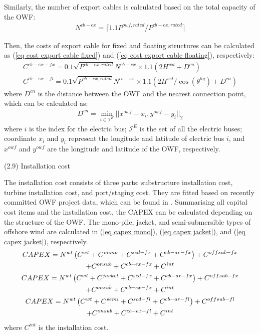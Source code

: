 \documentclass[sn-mathphys,Numbered]{sn-jnl}%
\theoremstyle{thmstyleone}%
\theoremstyle{thmstyletwo}%
\theoremstyle{thmstylethree}%
\begin{document}
Similarly, the number of export cables is calculated based on the total capacity of the OWF:
\begin{gather}
    N^{cb-ex} = \lceil 1.1 P^{owf,rated} / P^{cb-ex,rated} \rceil
\end{gather}

Then, the costs of export cable for fixed and floating structures can be calculated as (\ref{eq cost export cable fixed}) and (\ref{eq cost export cable floating}), respectively:
\begin{gather}
    C^{cb-ex-fx} =  0.1 \sqrt{P^{cb-ex,rated}} N^{cb-ex} \times 1.1 (2 H^{wd} + D^{cn})
\label{eq cost export cable fixed} \\
    C^{cb-ex-fl} =  0.1 \sqrt{P^{cb-ex,rated}} N^{cb-ex} \times 1.1 (2 H^{wd}/\cos{(\theta^{hg})} + D^{cn})
\label{eq cost export cable floating} 
\end{gather}
where $D^{cn}$ is the distance between the OWF and the nearest connection point, which can be calculated as:
\begin{gather}
    D^{cn} = \min_{i \in \mathcal{I}^{E}} ||x^{owf}-x_i, y^{owf}-y_i||_2
\label{eq distance to power bus}
\end{gather}
where $i$ is the index for the electric bus; $\mathcal{I}^{E}$ is the set of all the electric buses; coordinate $x_i$ and $y_i$ represent the longitude and latitude of electric bus $i$, and $x^{owf}$ and $y^{owf}$ are the longitude and latitude of the OWF, respectively.

(2.9) Installation cost

The installation cost consists of three parts: substructure installation cost, turbine installation cost, and port/staging cost. They are fitted based on recently committed OWF project data, which can be found in \cite{ASpatialEconomic}.
Summarising all capital cost items and the installation cost, the CAPEX can be calculated depending on the structure of the OWF. The mono-pile, jacket, and semi-submersible types of offshore wind are calculated in (\ref{eq capex mono}), (\ref{eq capex jacket}), and (\ref{eq capex jacket}), respectively.
\begin{gather}
    CAPEX = N^{wt} \left( C^{wt} + C^{mono} + C^{scd-fx} + C^{cb-ar-fx} \right) + C^{offsub-fx} \notag\\
    + C^{onsub} + C^{cb-ex-fx} + C^{int}
\label{eq capex mono} \\
    CAPEX = N^{wt} \left( C^{wt} + C^{jacket} + C^{scd-fx} + C^{cb-ar-fx} \right) + C^{offsub-fx} 
    \notag\\
    + C^{onsub} + C^{cb-ex-fx} + C^{int}
\label{eq capex jacket} \\
    CAPEX = N^{wt} \left( C^{wt} + C^{semi} + C^{scd-fl} + C^{cb-ar-fl} \right) + C^{offsub-fl} 
    \notag\\
    + C^{onsub} + C^{cb-ex-fl} + C^{int}
\label{eq capex semi}
\end{gather}
where $C^{int}$ is the installation cost.
\end{document}
